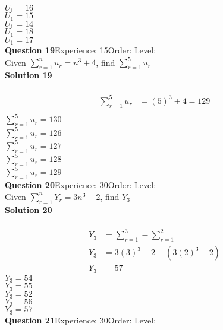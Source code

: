 \documentclass{article}
\begin{document}
$U_1=16$\\
$U_1=15$\\
$U_1=14$\\
$U_1=18$\\
$U_1=17$\\
\noindent\textbf{Question 19}\hspace{20pt}Experience: 15\hspace{20pt}Order: \hspace{20pt}Level: \\[2pt]
Given $\displaystyle\sum_{r=1}^{n} u_r = n^3+4$, find $\displaystyle\sum_{r=1}^{5} u_r$\\[4pt]
\noindent\textbf{Solution 19}\\[2pt]
\\[-10pt]\begin{align*}
\displaystyle\sum_{r=1}^{5} u_r &= (5)^3+4=129\\[2pt]
\end{align*}
$\displaystyle\sum_{r=1}^{5} u_r=130$\\
$\displaystyle\sum_{r=1}^{5} u_r=126$\\
$\displaystyle\sum_{r=1}^{5} u_r=127$\\
$\displaystyle\sum_{r=1}^{5} u_r=128$\\
$\displaystyle\sum_{r=1}^{5} u_r=129$\\
\noindent\textbf{Question 20}\hspace{20pt}Experience: 30\hspace{20pt}Order: \hspace{20pt}Level: \\[2pt]
Given $\displaystyle\sum_{r=1}^{n} Y_r = 3n^3-2$, find $Y_3$\\[4pt]
\noindent\textbf{Solution 20}\\[2pt]
\\[-10pt]\begin{align*}
Y_3&=\displaystyle\sum_{r=1}^{3} - \displaystyle\sum_{r=1}^{2}\\[2pt]
Y_3&=3(3)^3-2 - (3(2)^3-2)\\[2pt]
Y_3&=57
\end{align*}
$Y_3=54$\\
$Y_3=55$\\
$Y_3=52$\\
$Y_3=56$\\
$Y_3=57$\\
\noindent\textbf{Question 21}\hspace{20pt}Experience: 30\hspace{20pt}Order: \hspace{20pt}Level: \\[2pt]
\end{document}
